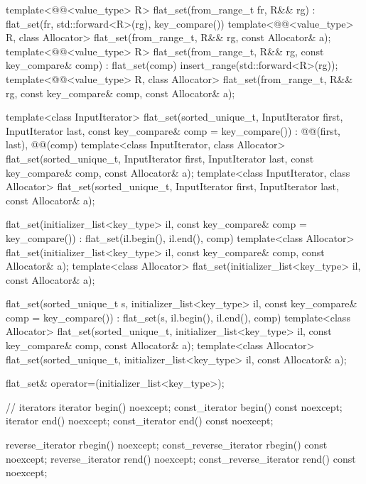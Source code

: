 \begin{codeblock}
{{    template<@@<value_type> R>
      flat_set(from_range_t fr, R&& rg)
        : flat_set(fr, std::forward<R>(rg), key_compare()) { }
    template<@@<value_type> R, class Allocator>
      flat_set(from_range_t, R&& rg, const Allocator& a);
    template<@@<value_type> R>
      flat_set(from_range_t, R&& rg, const key_compare& comp)
        : flat_set(comp)
        { insert_range(std::forward<R>(rg)); }
    template<@@<value_type> R, class Allocator>
       flat_set(from_range_t, R&& rg, const key_compare& comp, const Allocator& a);

    template<class InputIterator>
      flat_set(sorted_unique_t, InputIterator first, InputIterator last,
               const key_compare& comp = key_compare())
        : @@(first, last), @@(comp) { }
    template<class InputIterator, class Allocator>
      flat_set(sorted_unique_t, InputIterator first, InputIterator last,
               const key_compare& comp, const Allocator& a);
    template<class InputIterator, class Allocator>
      flat_set(sorted_unique_t, InputIterator first, InputIterator last, const Allocator& a);

    flat_set(initializer_list<key_type> il, const key_compare& comp = key_compare())
        : flat_set(il.begin(), il.end(), comp) { }
    template<class Allocator>
      flat_set(initializer_list<key_type> il, const key_compare& comp, const Allocator& a);
    template<class Allocator>
      flat_set(initializer_list<key_type> il, const Allocator& a);

    flat_set(sorted_unique_t s, initializer_list<key_type> il,
             const key_compare& comp = key_compare())
        : flat_set(s, il.begin(), il.end(), comp) { }
    template<class Allocator>
      flat_set(sorted_unique_t, initializer_list<key_type> il,
               const key_compare& comp, const Allocator& a);
    template<class Allocator>
      flat_set(sorted_unique_t, initializer_list<key_type> il, const Allocator& a);

    flat_set& operator=(initializer_list<key_type>);

    // iterators
    iterator               begin() noexcept;
    const_iterator         begin() const noexcept;
    iterator               end() noexcept;
    const_iterator         end() const noexcept;

    reverse_iterator       rbegin() noexcept;
    const_reverse_iterator rbegin() const noexcept;
    reverse_iterator       rend() noexcept;
    const_reverse_iterator rend() const noexcept;

}}
\end{codeblock}
